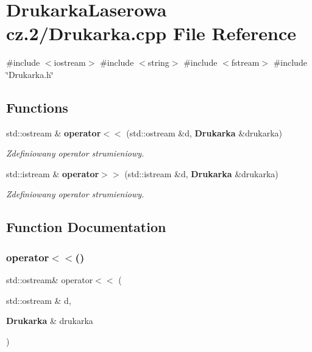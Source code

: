 \section{Drukarka\+Laserowa cz.2/\+Drukarka.cpp File Reference}
\label{_drukarka_8cpp}
{\ttfamily \#include $<$iostream$>$}\newline
{\ttfamily \#include $<$string$>$}\newline
{\ttfamily \#include $<$fstream$>$}\newline
{\ttfamily \#include \char`\"{}Drukarka.\+h\char`\"{}}\newline
\subsection*{Functions}
\begin{DoxyCompactItemize}
\item 
std\+::ostream \& \textbf{ operator$<$$<$} (std\+::ostream \&d, \textbf{ Drukarka} \&drukarka)
\begin{DoxyCompactList}\small\item\em Zdefiniowany operator strumieniowy. \end{DoxyCompactList}\item 
std\+::istream \& \textbf{ operator$>$$>$} (std\+::istream \&d, \textbf{ Drukarka} \&drukarka)
\begin{DoxyCompactList}\small\item\em Zdefiniowany operator strumieniowy. \end{DoxyCompactList}\end{DoxyCompactItemize}


\subsection{Function Documentation}
\mbox{\label{_drukarka_8cpp_a82275125afd4c7b7e83ea20c28802918}} 
\subsubsection{operator$<$$<$()}
{\footnotesize\ttfamily std\+::ostream\& operator$<$$<$ (\begin{DoxyParamCaption}\item[{std\+::ostream \&}]{d,  }\item[{\textbf{ Drukarka} \&}]{drukarka }\end{DoxyParamCaption})}



